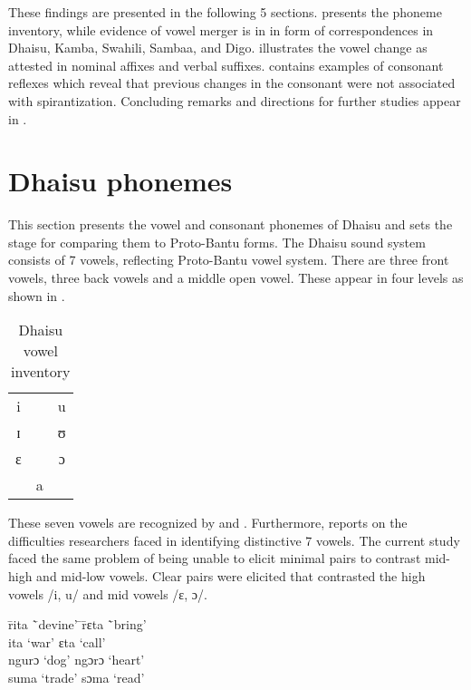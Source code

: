 \documentclass[output=paper,colorlinks,citecolor=brown]{langscibook}
\begin{document}
These findings are presented in the following 5 sections.  presents the phoneme inventory, while evidence of vowel merger is in  in form of correspondences in Dhaisu, Kamba, Swahili, Sambaa, and Digo.  illustrates the vowel change as attested in nominal affixes and verbal suffixes.  contains examples of consonant reflexes which reveal that previous changes in the consonant were not associated with spirantization. Concluding remarks and directions for further studies appear in .

\section{Dhaisu phonemes}\label{sec:ngonyani:2}

This section presents the vowel and consonant phonemes of Dhaisu and sets the stage for comparing them to Proto-Bantu forms. The Dhaisu sound system consists of 7 vowels, reflecting Proto-Bantu vowel system. There are three front vowels, three back vowels and a middle open vowel. These appear in four levels 
as shown in .


\begin{table}
	\caption{Dhaisu vowel inventory \citep[4]{RugemaliraEtAl2019}}
    \label{tab:ngonyani:1}
    \begin{tabular}{ccc}
        i   &     & u\\
        ɪ   &     & ʊ\\
        ɛ   &     & ɔ\\
            & a   & \\
    \end{tabular}
\end{table}


These seven vowels are recognized by \cite{Nurse2000}  and \cite{RugemaliraEtAl2019}. Furthermore, \cite[20]{Nurse2000} reports on the difficulties researchers faced in identifying distinctive 7 vowels. The current study faced the same problem of being unable to elicit minimal pairs to contrast mid-high and mid-low vowels. Clear pairs were elicited that contrasted the high vowels /i, u/ and mid vowels /ɛ, ɔ/.

\ea%
    \label{ex:ngonyani:1}
    \begin{tabbing}
        \= rita \quad\= `devine' \quad\= \quad\=  rɛta \quad\= `bring'\\
        \> ita \> `war' \> \> ɛta \> `call'\\
        \> ngurɔ \> `dog' \> \> ngɔrɔ \> `heart' \\
        \> suma \> `trade' \> \> sɔma \> `read'
\end{tabbing}
\z
\end{document}
